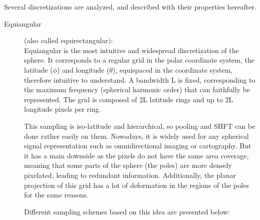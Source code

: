 \documentclass[11pt]{report}
\begin{document}
Several discretizations are analyzed, and described with their properties hereafter.

\begin{description}
    \item[Equiangular] (also called equirectangular):\\ 
    Equiangular is the most intuitive and widespread discretization of the sphere. It corresponds to a regular grid in the polar coordinate system, the latitude ($\phi$) and longitude ($\theta$), equispaced in the coordinate system, therefore intuitive to understand. A bandwidth L is fixed, corresponding to the maximum frequency (spherical harmonic order) that can faithfully be represented. The grid is composed of 2L latitude rings and up to 2L longitude pixels per ring.
            
    This sampling is iso-latitude and hierarchical, so pooling and SHFT can be done rather easily on them.
    Nowadays, it is widely used for any spherical signal representation such as omnidirectional imaging or cartography. But it has a main downside as the pixels do not have the same area coverage, meaning that some parts of the sphere (the poles) are more densely pixelated, leading to redundant information.
    Additionally, the planar projection of this grid has a lot of deformation in the regions of the poles for the same reasons.
    
    Different sampling schemes based on this idea are presented below:

\end{description}
\end{document}
